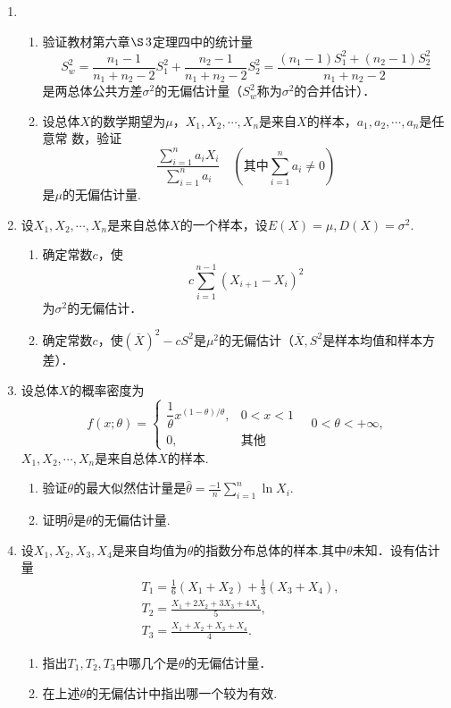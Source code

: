 \documentclass[10pt,a4paper]{article}
\begin{document}
\begin{enumerate}
    \item \begin{enumerate}
        \item 验证教材第六章$\S\, 3$定理四中的统计量
        $$S_w^2=\frac{n_1-1}{n_1+n_2-2}S_1^2+\frac{n_2-1}{n_1+n_2-2}S_2^2=\frac{(n_1-1)S_1^2+(n_2-1)S_2^2}{n_1+n_2-2}$$
        是两总体公共方差$\sigma^2$的无偏估计量（$S_w^2$称为$\sigma^2$的合并估计）．
        \item 设总体$X$的数学期望为$\mu$，$X_1,X_2,\cdots,X_n$是来自$X$的样本，$a_1,a_2,\cdots,a_n$是任意常
        数，验证
        $$\frac{\displaystyle{\sum_{i=1}^n a_i X_i}}{\displaystyle{\sum _{i=1}^n a_i}}\quad(\mbox{其中}\sum_{i=1}^n a_i \neq 0)$$
        是$\mu$的无偏估计量.
    \end{enumerate}
    \clearpage


    \item 设$X_1,X_2,\cdots,X_n$是来自总体$X$的一个样本，设$E(X)=\mu,D(X)=\sigma^2$.
    \begin{enumerate}
        \item 确定常数$c$，使$$c\sum_{i=1}^{n-1}(X_{i+1}-X_i)^2$$为$\sigma^2$的无偏估计．
        \item 确定常数$c$，使$(\overline{X})^2-cS^2$是$\mu^2$的无偏估计（$\overline{X},S^2$是样本均值和样本方差）．
    \end{enumerate}
    \clearpage


    \item 设总体$X$的概率密度为
    \renewcommand{\arraystretch}{1.3}
    $$f(x;\theta)=\left\{\begin{array}{ll}
        \dfrac{1}{\theta}x^{(1-\theta)/\theta}, & 0<x<1\\
        0, & \mbox{其他}
    \end{array}\right.\quad 0<\theta<+\infty,$$
    \renewcommand{\arraystretch}{1.0}
    $X_1,X_2,\cdots,X_n$是来自总体$X$的样本.
    \begin{enumerate}
        \item 验证$\theta$的最大似然估计量是$\displaystyle{\hat{\theta}=\frac{-1}{n}\sum_{i=1}^n \ln X_i}$.
        \item 证明$\hat{\theta}$是$\theta$的无偏估计量.
    \end{enumerate}
    \clearpage

    \item 设$X_1,X_2,X_3,X_4$是来自均值为$\theta$的指数分布总体的样本.其中$\theta$未知．设有估计量
    \begin{equation}
        \begin{split}
            & T_1=\frac{1}{6}(X_1+X_2)+\frac{1}{3}(X_3+X_4),\\
            & T_2=\frac{X_1+2X_2+3X_3+4X_4}{5},\\
            & T_3=\frac{X_1+X_2+X_3+X_4}{4}.
        \end{split}
        \nonumber
    \end{equation}
    \begin{enumerate}
        \item 指出$T_1,T_2,T_3$中哪几个是$\theta$的无偏估计量．
        \item 在上述$\theta$的无偏估计中指出哪一个较为有效.
    \end{enumerate}
    \clearpage



\end{enumerate}
\end{document}
